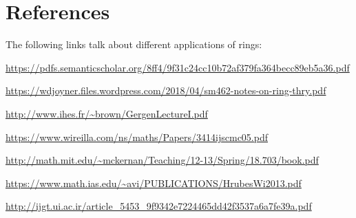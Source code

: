 \section{References}
\label{sec:rings:refs}

The following links talk about different applications of rings:

\noindent \url{https://pdfs.semanticscholar.org/8ff4/9f31c24cc10b72af379fa364becc89eb5a36.pdf}

\noindent \url{https://wdjoyner.files.wordpress.com/2018/04/sm462-notes-on-ring-thry.pdf}

\noindent \url{http://www.ihes.fr/~brown/GergenLectureI.pdf}

\noindent \url{https://www.wireilla.com/ns/maths/Papers/3414ijscmc05.pdf}

\noindent \url{http://math.mit.edu/~mckernan/Teaching/12-13/Spring/18.703/book.pdf}

\noindent \url{https://www.math.ias.edu/~avi/PUBLICATIONS/HrubesWi2013.pdf}

\noindent \url{http://ijgt.ui.ac.ir/article_5453_9f9342e7224465dd42f3537a6a7fe39a.pdf}







